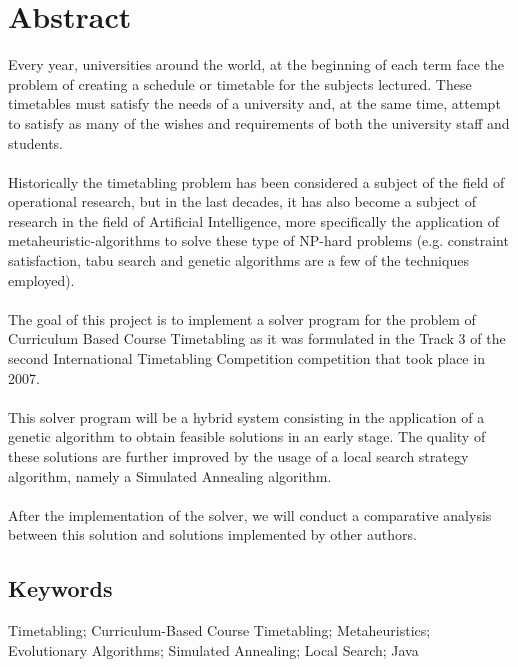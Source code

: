 \chapter*{Abstract}
Every year, universities around the world, at the beginning of each term face the problem of creating a schedule or timetable for the subjects lectured. These timetables must satisfy the needs of a university and, at the same time, attempt to satisfy as many of the wishes and requirements of both the university staff and students. \\
\\
Historically the timetabling problem has been considered a subject of the field of operational research, but in the last decades, it has also become a subject of research in the field of Artificial Intelligence, more specifically the application of metaheuristic-algorithms to solve these type of NP-hard problems (e.g. constraint satisfaction, tabu search and genetic algorithms are a few of the techniques employed). \\
\\
The goal of this project is to implement a solver program for the problem of Curriculum Based Course Timetabling as it was formulated in the Track 3 of the second International Timetabling Competition competition that took place in 2007.\\
\\
This solver program will be a hybrid system consisting in the application of a genetic algorithm to obtain feasible solutions in an early stage. The quality of these solutions are further improved by the usage of a local search strategy algorithm, namely a Simulated Annealing algorithm.\\
\\
After the implementation of the solver, we will conduct a comparative analysis between this solution and solutions implemented by other authors.\\

\section*{Keywords}
Timetabling; Curriculum-Based Course Timetabling; Metaheuristics; Evolutionary Algorithms; Simulated Annealing; Local Search; Java 
